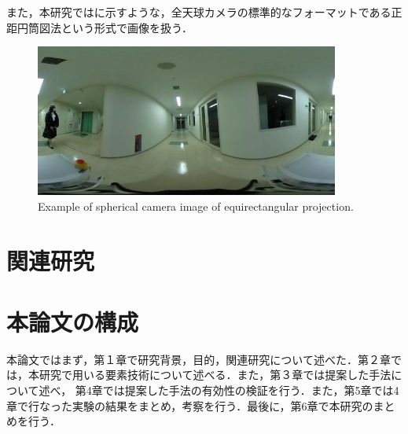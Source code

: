\documentclass[../main]{subfiles}
\begin{document}
        また，本研究ではに示すような，全天球カメラの標準的なフォーマットである正距円筒図法という形式で画像を扱う．

        \begin{figure}[H]
            \centering
            \includegraphics[width=10cm]{../images/18F_aisle_exp.jpg}
            \caption{Example of spherical camera image of equirectangular projection.}
            \label{figure::image_exp}
        \end{figure}
        
        \newpage

        \section{関連研究}
        \section{本論文の構成}
        本論文ではまず，第１章で研究背景，目的，関連研究について述べた．第２章では，本研究で用いる要素技術について述べる．また，第３章では提案した手法について述べ，
        第4章では提案した手法の有効性の検証を行う．また，第5章では4章で行なった実験の結果をまとめ，考察を行う．最後に，第6章で本研究のまとめを行う．
\end{document}
